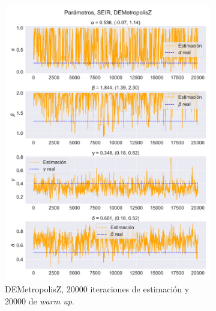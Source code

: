 \begin{figure}[h]
    \centering
    \begin{subfigure}[b]{0.49\linewidth}
        \centering
        \includegraphics[width=\linewidth]{img/content/chapter4/DEMetropolis_seir_params_trace.pdf}
        \caption{DEMetropolisZ, 20000 iteraciones de estimación y 20000 de \textit{warm up}.}
        \label{fig:DEMetropolisZ_seir_params_trace}
    \end{subfigure}
    \begin{subfigure}[b]{0.49\linewidth}
        \centering

\end{subfigure}
\end{figure}
